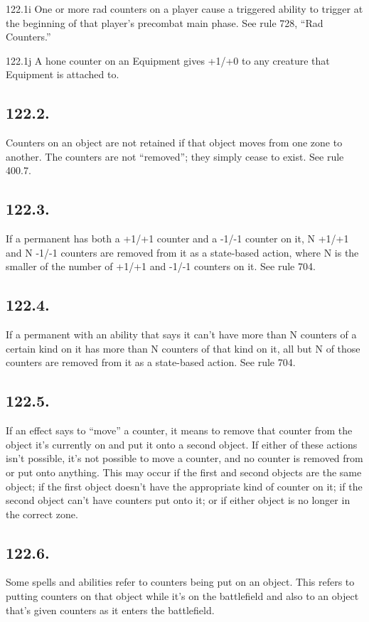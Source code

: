 122.1i One or more rad counters on a player cause a triggered ability to trigger at the beginning of that player’s precombat main phase. See rule 728, “Rad Counters.”

122.1j A hone counter on an Equipment gives +1/+0 to any creature that Equipment is attached to.

\subsection*{122.2.}
Counters on an object are not retained if that object moves from one zone to another. The counters are not “removed”; they simply cease to exist. See rule 400.7.

\subsection*{122.3.}
If a permanent has both a +1/+1 counter and a -1/-1 counter on it, N +1/+1 and N -1/-1 counters are removed from it as a state-based action, where N is the smaller of the number of +1/+1 and -1/-1 counters on it. See rule 704.

\subsection*{122.4.}
If a permanent with an ability that says it can’t have more than N counters of a certain kind on it has more than N counters of that kind on it, all but N of those counters are removed from it as a state-based action. See rule 704.

\subsection*{122.5.}
If an effect says to “move” a counter, it means to remove that counter from the object it’s currently on and put it onto a second object. If either of these actions isn’t possible, it’s not possible to move a counter, and no counter is removed from or put onto anything. This may occur if the first and second objects are the same object; if the first object doesn’t have the appropriate kind of counter on it; if the second object can’t have counters put onto it; or if either object is no longer in the correct zone.

\subsection*{122.6.}
Some spells and abilities refer to counters being put on an object. This refers to putting counters on that object while it’s on the battlefield and also to an object that’s given counters as it enters the battlefield.


